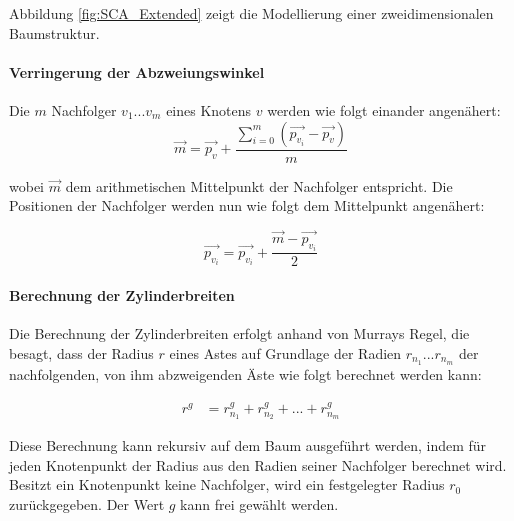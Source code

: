 Abbildung \ref{fig:SCA_Extended} zeigt die Modellierung einer zweidimensionalen Baumstruktur.

\paragraph{Verringerung der Abzweiungswinkel} \label{par:VerringerungAbzweigungswinkel}

Die $m$ Nachfolger $v_{1} ... v_{m}$ eines Knotens $v$ werden wie folgt einander angenähert:
\begin{equation}
\overrightarrow{m} = \overrightarrow{p_v} + \dfrac{\sum_{i=0}^{m} (\overrightarrow{p_{v_i}} - \overrightarrow{p_v})}{m}
\end{equation}

wobei $\overrightarrow{m}$ dem arithmetischen Mittelpunkt der Nachfolger entspricht. Die Positionen der Nachfolger werden nun wie folgt dem Mittelpunkt angenähert:

\begin{equation}
\overrightarrow{p_{v_i}} = \overrightarrow{p_{v_i}} + \dfrac{\overrightarrow{m} -\overrightarrow{p_{v_i}}}{2}
\end{equation}


\paragraph{Berechnung der Zylinderbreiten}

Die Berechnung der Zylinderbreiten erfolgt anhand von Murrays Regel, die besagt, dass der Radius $r$ eines Astes auf Grundlage der Radien $r_{n_1}...r_{n_m}$ der nachfolgenden, von ihm abzweigenden Äste wie folgt berechnet werden kann: 

\begin{equation}
\begin{array}{ll}
r^g & = r_{n_1}^g + r_{n_2}^g + ... + r_{n_m}^g 
\end{array}
\label{eq:Radiusberechnung}
\end{equation} 

Diese Berechnung kann rekursiv auf dem Baum ausgeführt werden, indem für jeden Knotenpunkt der Radius aus den Radien seiner Nachfolger berechnet wird. Besitzt ein Knotenpunkt keine Nachfolger, wird ein festgelegter Radius $r_0$ zurückgegeben. \cite[Abschn. 3.5]{LeafVenation:05} Der Wert $g$ kann frei gewählt werden.

